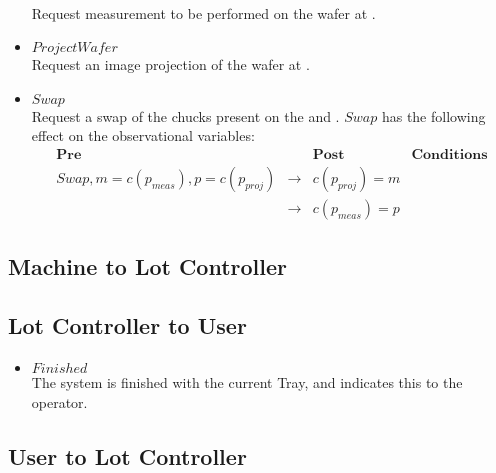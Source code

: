 \begin{itemize}
\\Request measurement to be performed on the wafer at \chuckMeas.
\item $\mathit{ProjectWafer}$
\\Request an image projection of the wafer at \chuckProj.
\item $\mathit{Swap}$
\\Request a swap of the chucks present on the \chuckMeas and \chuckProj.
$\mathit{Swap}$ has the following effect on the observational variables:
\begin{align*}
&\textbf{Pre}&&\textbf{Post}&\textbf{Conditions}&\\
&Swap, m = c(p_\mathit{meas}), p = c(p_\mathit{proj})&\rightarrow&c(p_\mathit{proj}) = m&&\\
&&\rightarrow&c(p_\mathit{meas}) = p&&
\end{align*}
\end{itemize}

\subsection{Machine to Lot Controller}

\subsection{Lot Controller to User}
\begin{itemize}
    \item $\mathit{Finished}$\\
    The system is finished with the current Tray, and indicates this to the operator.
\end{itemize}

\subsection{User to Lot Controller}
